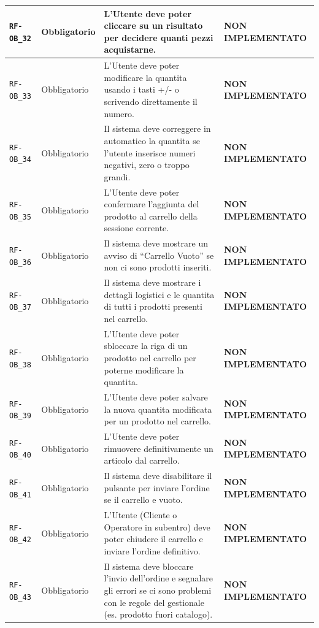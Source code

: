 \documentclass[a4paper, 11pt, oneside]{scrartcl}
\begin{document}
\begin{longtable}{|>{\raggedright\arraybackslash}p{}|>{\raggedright\arraybackslash}p{}|>{\raggedright\arraybackslash}p{}|>{\raggedright\arraybackslash}p{}|}
    \hline
    \texttt{RF-OB\_32} & Obbligatorio & L'Utente deve poter cliccare su un risultato per decidere quanti pezzi acquistarne. & \textbf{NON IMPLEMENTATO} \\
    \hline
    \texttt{RF-OB\_33} & Obbligatorio & L'Utente deve poter modificare la quantita usando i tasti +/- o scrivendo direttamente il numero. & \textbf{NON IMPLEMENTATO} \\
    \hline
    \texttt{RF-OB\_34} & Obbligatorio & Il sistema deve correggere in automatico la quantita se l'utente inserisce numeri negativi, zero o troppo grandi. & \textbf{NON IMPLEMENTATO} \\
    \hline
    \texttt{RF-OB\_35} & Obbligatorio & L'Utente deve poter confermare l'aggiunta del prodotto al carrello della sessione corrente. & \textbf{NON IMPLEMENTATO} \\
    \hline
    \texttt{RF-OB\_36} & Obbligatorio & Il sistema deve mostrare un avviso di ``Carrello Vuoto'' se non ci sono prodotti inseriti. & \textbf{NON IMPLEMENTATO} \\
    \hline
    \texttt{RF-OB\_37} & Obbligatorio & Il sistema deve mostrare i dettagli logistici e le quantita di tutti i prodotti presenti nel carrello. & \textbf{NON IMPLEMENTATO} \\
    \hline
    \texttt{RF-OB\_38} & Obbligatorio & L'Utente deve poter sbloccare la riga di un prodotto nel carrello per poterne modificare la quantita. & \textbf{NON IMPLEMENTATO} \\
    \hline
    \texttt{RF-OB\_39} & Obbligatorio & L'Utente deve poter salvare la nuova quantita modificata per un prodotto nel carrello. & \textbf{NON IMPLEMENTATO} \\
    \hline
    \texttt{RF-OB\_40} & Obbligatorio & L'Utente deve poter rimuovere definitivamente un articolo dal carrello. & \textbf{NON IMPLEMENTATO} \\
    \hline
    \texttt{RF-OB\_41} & Obbligatorio & Il sistema deve disabilitare il pulsante per inviare l'ordine se il carrello e vuoto. & \textbf{NON IMPLEMENTATO} \\
    \hline
    \texttt{RF-OB\_42} & Obbligatorio & L'Utente (Cliente o Operatore in subentro) deve poter chiudere il carrello e inviare l'ordine definitivo. & \textbf{NON IMPLEMENTATO} \\
    \hline
    \texttt{RF-OB\_43} & Obbligatorio & Il sistema deve bloccare l'invio dell'ordine e segnalare gli errori se ci sono problemi con le regole del gestionale (es. prodotto fuori catalogo). & \textbf{NON IMPLEMENTATO} \\

\end{longtable}
\end{document}
